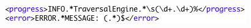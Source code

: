 \documentclass[times,11pt]{report}
\begin{document}
\begin{figure}[h!]
\begin{center}
\includegraphics[type=png,ext=.png,read=.png]{images/RegExps}
\end{center}
\end{figure}
\end{document}
